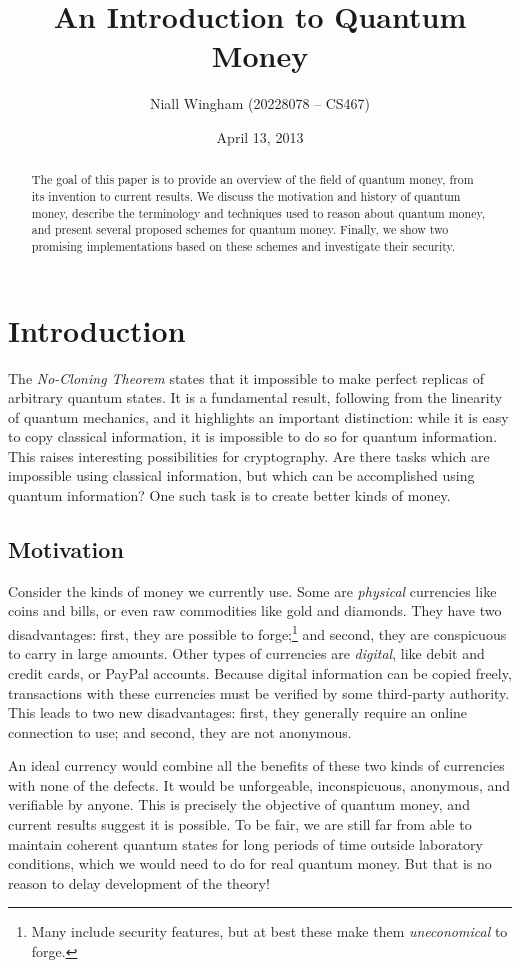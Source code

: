 \documentclass[12pt]{article}
\title{An Introduction to Quantum Money}
\author{Niall Wingham (20228078 -- CS467)}
\date{April 13, 2013}
\begin{document}
\maketitle

\begin{abstract}
The goal of this paper is to provide an overview of the field of quantum money, from its invention to current results.  We discuss the motivation and history of quantum money, describe the terminology and techniques used to reason about quantum money, and present several proposed schemes for quantum money.  Finally, we show two promising implementations based on these schemes and investigate their security.
\end{abstract}



\section{Introduction}
The \emph{No-Cloning Theorem} states that it impossible to make perfect replicas of arbitrary quantum states.  It is a fundamental result, following from the linearity of quantum mechanics, and it highlights an important distinction: while it is easy to copy classical information, it is impossible to do so for quantum information.  This raises interesting possibilities for cryptography.  Are there tasks which are impossible using classical information, but which can be accomplished using quantum information?  One such task is to create better kinds of money.

\subsection{Motivation}
Consider the kinds of money we currently use.  Some are \emph{physical} currencies like coins and bills, or even raw commodities like gold and diamonds.  They have two disadvantages: first, they are possible to forge;\footnote{Many include security features, but at best these make them \emph{uneconomical} to forge.} and second, they are conspicuous to carry in large amounts.  Other types of currencies are \emph{digital}, like debit and credit cards, or PayPal accounts.  Because digital information can be copied freely, transactions with these currencies must be verified by some third-party authority.  This leads to two new disadvantages: first, they generally require an online connection to use; and second, they are not anonymous.

An ideal currency would combine all the benefits of these two kinds of currencies with none of the defects.  It would be unforgeable, inconspicuous, anonymous, and verifiable by anyone.  This is precisely the objective of quantum money, and current results suggest it is possible.  To be fair, we are still far from able to maintain coherent quantum states for long periods of time outside laboratory conditions, which we would need to do for real quantum money.  But that is no reason to delay development of the theory!
\end{document}
